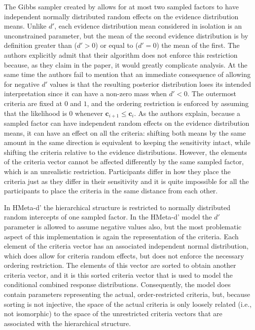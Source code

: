 \documentclass[a4paper,man,apacite,floatsintext]{apa6}
\begin{document}
The Gibbs sampler created by  allows for
at most two sampled factors to have independent normally distributed
random effects on the evidence distribution means. Unlike $d'$, each
evidence distribution mean considered in isolation is an unconstrained
parameter, but the mean of the second evidence distribution is by
definition greater than ($d' > 0$) or equal to ($d' = 0$) the mean of
the first. The authors explicitly admit that their algorithm does not
enforce this restriction because, as they claim in the paper, it would
greatly complicate analysis. At the same time the authors fail to
mention that an immediate consequence of allowing for negative $d'$
values is that the resulting posterior distribution loses its intended
interpretation since it can have a non-zero mass when $d' < 0$. The
outermost criteria are fixed at $0$ and $1$, and the ordering
restriction is enforced by assuming that the likelihood is $0$
whenever $\bm{c}_{i+1} \leq \bm{c}_i$. As the authors explain, because
a sampled factor can have independent random effects on the evidence
distribution means, it can have an effect on all the criteria:
shifting both means by the same amount in the same direction is
equivalent to keeping the sensitivity intact, while shifting the
criteria relative to the evidence distributions. However, the elements
of the criteria vector cannot be affected differently by the same
sampled factor, which is an unrealistic restriction. Participants
differ in how they place the criteria just as they differ in their
sensitivity and it is quite impossible for all the participants to
place the criteria in the same distance from each other.

In HMeta-d' the hierarchical structure is restricted to normally
distributed random intercepts of one sampled factor. In the HMeta-d'
model the $d'$ parameter is allowed to assume negative values also,
but the most problematic aspect of this implementation is again the
representation of the criteria. Each element of the criteria vector
has an associated independent normal distribution, which does allow
for criteria random effects, but does not enforce the necessary
ordering restriction. The elements of this vector are sorted to obtain
another criteria vector, and it is this sorted criteria vector that is
used to model the conditional combined response
distributions. Consequently, the model does contain parameters
representing the actual, order-restricted criteria, but, because
sorting is not injective, the space of the actual criteria is only
loosely related (i.e., not isomorphic) to the space of the
unrestricted criteria vectors that are associated with the
hierarchical structure.
\end{document}
